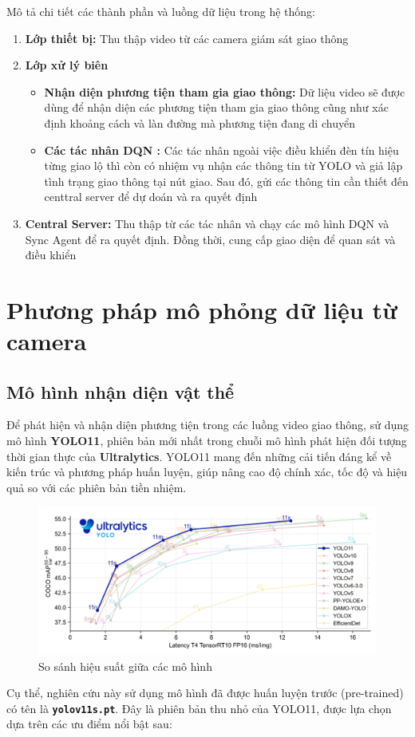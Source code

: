 Mô tả chi tiết các thành phần và luồng dữ liệu trong hệ thống:

\begin{enumerate}
    \item \textbf{Lớp thiết bị:} Thu thập video từ các camera giám sát giao thông
    \item \textbf{Lớp xử lý biên}
    \begin{itemize}
        \item \textbf{Nhận diện phương tiện tham gia giao thông:} Dữ liệu video sẽ được dùng để nhận diện các phương tiện tham gia giao thông cũng như xác định khoảng cách và làn đường mà phương tiện đang di chuyển
        \item \textbf{Các tác nhân DQN :} Các tác nhân ngoài việc điều khiển đèn tín hiệu từng giao lộ thì còn có nhiệm vụ nhận các thông tin từ YOLO và giả lập tình trạng giao thông tại nút giao. Sau đó, gửi các thông tin cần thiết đến centtral server để dự doán và ra quyết định 
    \end{itemize}
    \item \textbf{Central Server:} Thu thập từ các tác nhân và chạy các mô hình DQN và Sync Agent để ra quyết định. Đồng thời, cung cấp giao diện để quan sát và điều khiển
\end{enumerate}

\section{Phương pháp mô phỏng dữ liệu từ camera}
\subsection{Mô hình nhận diện vật thể}
Để phát hiện và nhận diện phương tiện trong các luồng video giao thông, sử dụng mô hình \textbf{YOLO11}, phiên bản mới nhất trong chuỗi mô hình phát hiện đối tượng thời gian thực của \textbf{Ultralytics}. YOLO11 mang đến những cải tiến đáng kể về kiến trúc và phương pháp huấn luyện, giúp nâng cao độ chính xác, tốc độ và hiệu quả so với các phiên bản tiền nhiệm.

\begin{figure}[!htp]
    \centering
    \includegraphics[width=\textwidth]{img/yolo_models}
    \caption{So sánh hiệu suất giữa các mô hình \footnotemark[1]}
    \label{fig:yolo_models}
\end{figure}
Cụ thể, nghiên cứu này sử dụng mô hình đã được huấn luyện trước (pre-trained) có tên là \textbf{\texttt{yolov11s.pt}}. Đây là phiên bản thu nhỏ của YOLO11, được lựa chọn dựa trên các ưu điểm nổi bật sau:

